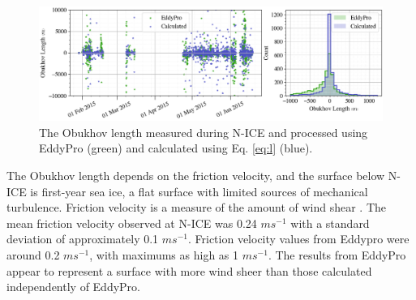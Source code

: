 \begin{figure}[g]
    \centering
    \includegraphics[width=1\linewidth]{figures/chapter5/ch3_obukhovlength.png}
    \caption[Obukhov length]{The Obukhov length measured during N-ICE and processed using EddyPro (green) and calculated using Eq. \ref{eq:l} (blue).}
    \label{fig:ol}
\end{figure}

The Obukhov length depends on the friction velocity, and the surface below N-ICE is first-year sea ice, a flat surface with limited sources of mechanical turbulence. Friction velocity is a measure of the amount of wind shear \citep{stull:1988}. The mean friction velocity observed at N-ICE was 0.24 $m s^{-1}$ with a standard deviation of approximately 0.1 $m s^{-1}$. Friction velocity values from Eddypro were around 0.2 $m s^{-1}$, with maximums as high as 1 $m s^{-1}$. The results from EddyPro appear to represent a surface with more wind sheer than those calculated independently of EddyPro. 


